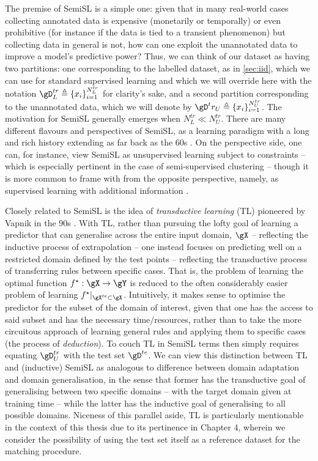 The premise of SemiSL is a simple one: given that in many real-world cases collecting annotated
data is expensive (monetarily or temporally) or even prohibitive (for instance if the data is tied
to a transient phenomenon) but collecting data in general is not, how can one exploit the
unannotated data to improve a model's predictive power?
%
Thus, we can think of our dataset as having two partitions: one corresponding to the labelled
dataset, as in \ref{sec:iid}, which we can use for standard supervised learning and which we will
override here with the notation \( \gD^{tr}_L \triangleq \{ x_i \}_{i=1}^{N^{tr}_L} \) for
clarity's sake, and a second partition corresponding to the unannotated data, which we will denote
by \( \gD^tr_U  \triangleq \{ x_i \}_{i=1}^{N^{tr}_U} \).
%
The motivation for SemiSL generally emerges when \( N^{tr}_L \ll N^{tr}_U \).
%
There are many different flavours and perspectives of SemiSL, as a learning paradigm with a long
and rich history extending as far back as the 60s \citep{scudder1965probability,
fralick1967learning}. 
%
On the perspective side, one can, for instance, view SemiSL as unsupervised learning subject to
constraints -- which is especially pertinent in the case of semi-supervised clustering
\citep{bair2013semi} -- though it is more common to frame with from the opposite perspective,
namely, as supervised learning with additional information \citep{chapelle2009semi}.

%
%
Closely related to SemiSL is the idea of \emph{transductive learning} (TL) pioneered by Vapnik in
the 90s \citep{gammerman1998learning}. 
%
With TL, rather than pursuing the lofty goal of learning a predictor that can
generalise across the entire input domain, \( \gX \) -- reflecting the inductive process of
extrapolation -- one instead focuses on predicting well on a restricted domain defined by the test
points -- reflecting the transductive process of transferring rules between specific cases. 
%
That is, the problem of learning the optimal function \(f^\star: \gX \to \gY \) is reduced to the
often considerably easier problem of learning \(f^\star|_{ \gX^{te} \subset \gX } \).
%
Intuitively, it makes sense to optimise the predictor for the subset of the domain of interest,
given that one has the access to said subset and has the necessary time/resources, rather than to
take the more circuitous approach of learning general rules and applying them to specific cases
(the process of \emph{deduction}).
%
To couch TL in SemiSL terms then simply requires equating \(\gD^{tr}_U \) with the test set
\(\gD^{te} \).
%
We can view this distinction between TL and (inductive) SemiSL as analogous to difference between
domain adaptation and domain generalisation, in the sense that former has the transductive goal of
generalising between two specific domains -- with the target domain given at training time -- while
the latter has the inductive goal of generalising to all possible domains.
%
Niceness of this parallel aside, TL is particularly mentionable in the context of this thesis due
to its pertinence in Chapter 4, wherein we consider the possibility of using the test set itself as
a reference dataset for the matching procedure.


